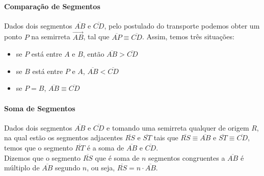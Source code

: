 \paragraph{Comparação de Segmentos} Dados dois segmentos $\overline{AB}$ e $\overline{CD}$, pelo postulado do transporte podemos obter um ponto $P$ na semirreta $\overrightarrow{AB}$, tal que $\overline{AP} \equiv \overline{CD}$. Assim, temos três situações:
\begin{itemize}
\item se $P$ está entre $A$ e $B$, então $\overline{AB} > \overline{CD}$
\item se $B$ está entre $P$ e $A$, $\overline{AB} < \overline{CD}$
\item se $P = B$, $\overline{AB} \equiv \overline{CD}$
\end{itemize}
\paragraph{Soma de Segmentos} Dados dois segmentos $\overline{AB}$ e $\overline{CD}$ e tomando uma semirreta qualquer de origem $R$, na qual estão os segmentos adjacentes $\overline{RS}$ e $\overline{ST}$ tais que $\overline{RS} \equiv \overline{AB}$ e $\overline{ST} \equiv \overline{CD}$, temos que o segmento $\overline{RT}$ é a soma de $\overline{AB}$ e $\overline{CD}$.\\
Dizemos que o segmento $\overline{RS}$ que é soma de $n$ segmentos congruentes a $\overline{AB}$ é múltiplo de $\overline{AB}$ segundo $n$, ou seja, $\overline{RS}=n \cdot \overline{AB}$.
